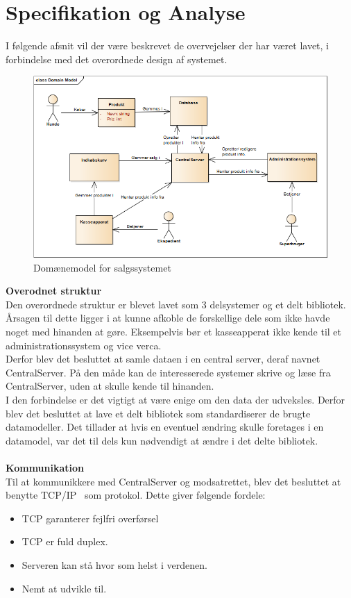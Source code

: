 \section{Specifikation og Analyse}

I følgende afsnit vil der være beskrevet de overvejelser der har været lavet, i forbindelse med det overordnede design af systemet.

\begin{figure}[H]
	\centering
	\includegraphics[width=1\textwidth]{Projektbeskrivelse/Images/DomainModel.png}
	\caption{Domænemodel for salgssystemet}
	\label{fig:domain}
\end{figure}


\textbf{Overodnet struktur}\\
Den overordnede struktur er blevet lavet som 3 delsystemer og et delt bibliotek. Årsagen til dette ligger i at kunne afkoble de forskellige dele som ikke havde noget med hinanden at gøre. Eksempelvis bør et kasseapperat ikke kende til et administrationssystem og vice verca.\\
Derfor blev det besluttet at samle dataen i en central server, deraf navnet CentralServer. På den måde kan de interesserede systemer skrive og læse fra CentralServer, uden at skulle kende til hinanden.\\
I den forbindelse er det vigtigt at være enige om den data der udveksles. Derfor blev det besluttet at lave et delt bibliotek som standardiserer de brugte datamodeller. Det tillader at hvis en eventuel ændring skulle foretages i en datamodel, var det til dels kun nødvendigt at ændre i det delte bibliotek.\\
\\

\textbf{Kommunikation}\\
Til at kommunikkere med CentralServer og modsatrettet, blev det besluttet at benytte TCP/IP~\cite{tcpip} som protokol. Dette giver følgende fordele:

\begin{itemize}
	\item TCP garanterer fejlfri overførsel
	\item TCP er fuld duplex. 
	\item Serveren kan stå hvor som helst i verdenen.
	\item Nemt at udvikle til.
\end{itemize}

